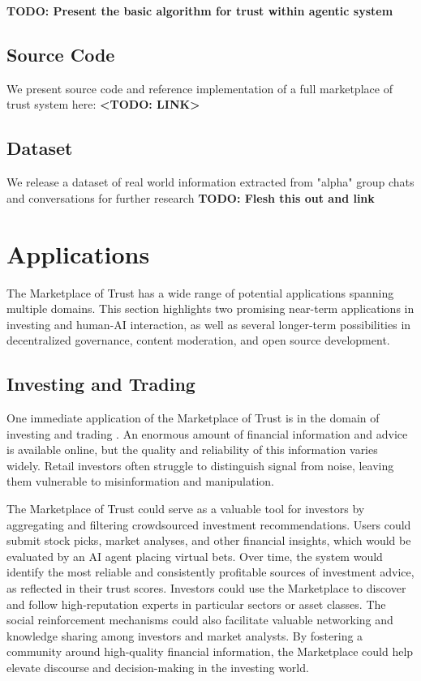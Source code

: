 \documentclass{article}
\begin{document}
\textbf{TODO: Present the basic algorithm for trust within agentic system
}
\subsection{Source Code}

We present source code and reference implementation of a full marketplace of trust system here:
\textbf{<TODO: LINK>}

\subsection{Dataset}

We release a dataset of real world information extracted from "alpha" group chats and conversations for further research
\textbf{TODO: Flesh this out and link
}
\section{Applications}

The Marketplace of Trust has a wide range of potential applications spanning multiple domains. This section highlights two promising near-term applications in investing and human-AI interaction, as well as several longer-term possibilities in decentralized governance, content moderation, and open source development.

\subsection{Investing and Trading}
One immediate application of the Marketplace of Trust is in the domain of investing and trading . An enormous amount of financial information and advice is available online, but the quality and reliability of this information varies widely. Retail investors often struggle to distinguish signal from noise, leaving them vulnerable to misinformation and manipulation.

The Marketplace of Trust could serve as a valuable tool for investors by aggregating and filtering crowdsourced investment recommendations. Users could submit stock picks, market analyses, and other financial insights, which would be evaluated by an AI agent placing virtual bets. Over time, the system would identify the most reliable and consistently profitable sources of investment advice, as reflected in their trust scores. Investors could use the Marketplace to discover and follow high-reputation experts in particular sectors or asset classes. The social reinforcement mechanisms could also facilitate valuable networking and knowledge sharing among investors and market analysts. By fostering a community around high-quality financial information, the Marketplace could help elevate discourse and decision-making in the investing world.
\end{document}
